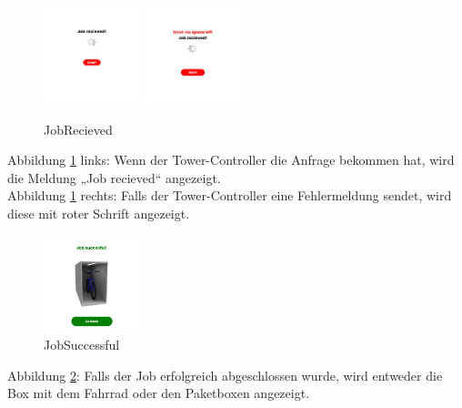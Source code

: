 \begin{figure}[H]
    \centering
    \includegraphics[width=0.25\textwidth]{images/app-screenshots/recieved.png}
    \includegraphics[width=0.25\textwidth]{images/app-screenshots/error.png}
    \caption{JobRecieved}
    \label{fig:screenwaiting}
\end{figure}
Abbildung \ref{fig:screenwaiting} links: Wenn der Tower-Controller die Anfrage bekommen hat, wird die Meldung „Job recieved“ angezeigt.\\
Abbildung \ref{fig:screenwaiting} rechts: Falls der Tower-Controller eine Fehlermeldung sendet, wird diese mit roter Schrift angezeigt.\\

\begin{figure}[H]
    \centering
    \includegraphics[width=0.25\textwidth]{images/app-screenshots/succes.png}
    \caption{JobSuccessful}
    \label{fig:success}
\end{figure}
Abbildung \ref{fig:success}: Falls der Job erfolgreich abgeschlossen wurde, wird entweder die Box mit dem Fahrrad oder den Paketboxen angezeigt.\\


